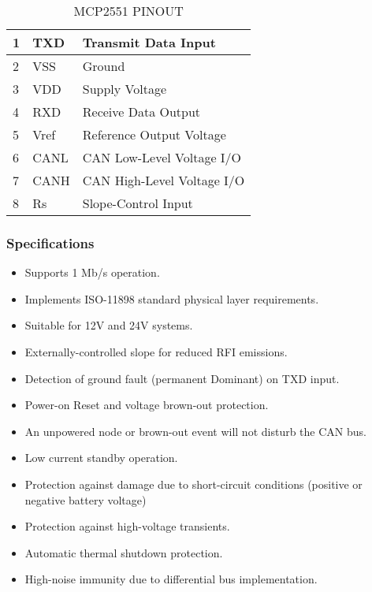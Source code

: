 \begin{table}[h!]
\centering
  \begin{tabular}{ | p{2cm}| p{2cm} | p{5cm}|} 
    \hline
    1  & TXD  & Transmit Data Input \\ \hline
    2  & VSS  & Ground \\ \hline
    3  & VDD  & Supply Voltage\\ \hline
    4  & RXD  & Receive Data Output\\ \hline
    5  & Vref & Reference Output Voltage\\\hline
    6  & CANL & CAN Low-Level Voltage I/O\\\hline
    7  & CANH & CAN High-Level Voltage I/O\\\hline
    8  & Rs   & Slope-Control Input\\
    \hline
  \end{tabular}
\caption{MCP2551 PINOUT}
\label{table: MCP2551 PINOUT}
\end{table}

\subsubsection{Specifications}
\begin{itemize} 
    \item Supports 1 Mb/s operation.
    \item Implements ISO-11898 standard physical layer requirements.
    \item Suitable for 12V and 24V systems.
    \item Externally-controlled slope for reduced RFI emissions.
    \item Detection of ground fault (permanent Dominant) on TXD input.
    \item Power-on Reset and voltage brown-out protection.
    \item An unpowered node or brown-out event will not disturb the CAN bus.
    \item Low current standby operation.
    \item Protection against damage due to short-circuit conditions (positive or negative battery voltage)
    \item Protection against high-voltage transients.
    \item Automatic thermal shutdown protection.
    \item High-noise immunity due to differential bus implementation.\\
\end{itemize}

